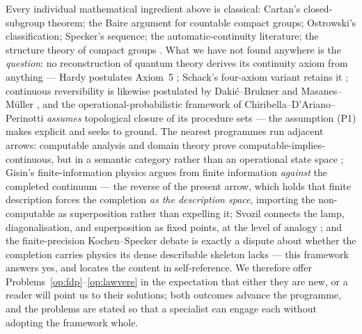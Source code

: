 Every individual mathematical ingredient above is classical: Cartan's closed-subgroup
theorem; the Baire argument for countable compact groups; Ostrowski's classification;
Specker's sequence; the automatic-continuity literature; the structure theory of compact
groups \cite{hofmannmorris}. What we have not found anywhere is the \emph{question}: no
reconstruction of quantum theory derives its continuity axiom from anything --- Hardy
postulates Axiom~5 \cite{hardy2001}; Schack's four-axiom variant retains it
\cite{schack2003}; continuous reversibility is likewise postulated by Dakić--Brukner and
Masanes--M\"uller \cite{dakicbrukner2011, masanesmueller2011}, and the
operational-probabilistic framework of Chiribella--D'Ariano--Perinotti \emph{assumes}
topological closure of its procedure sets \cite{cdp2011} --- the assumption (P1) makes
explicit and seeks to ground. The nearest programmes run adjacent arrows: computable
analysis and domain theory prove computable-implies-continuous, but in a semantic
category rather than an operational state space \cite{weihrauch2000, abramskyjung};
Gisin's finite-information physics argues from finite information \emph{against} the
completed continuum \cite{gisin2019, gisin2021} --- the reverse of the present arrow,
which holds that finite description forces the completion \emph{as the description
space}, importing the non-computable as superposition rather than expelling it; Svozil
connects the lamp, diagonalisation, and superposition as fixed points, at the level of
analogy \cite{svozil2009}; and the finite-precision Kochen--Specker debate
\cite{meyer1999, kent1999, cliftonkent2000} is exactly a dispute about whether the
completion carries physics its dense describable skeleton lacks --- this framework
answers yes, and locates the content in self-reference. We therefore offer
Problems~\ref{op:fdp}--\ref{op:lawvere} in the expectation that either they are new, or
a reader will point us to their solutions; both outcomes advance the programme, and the
problems are stated so that a specialist can engage each without adopting the framework
whole.

